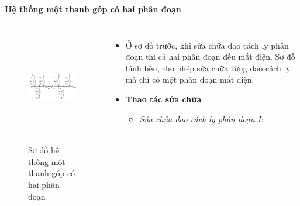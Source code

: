 \documentclass{beamer}
\begin{document}
\begin{frame}{\textbf{Hệ thống một thanh góp có hai phân đoạn }}
\begin{columns}
\begin{figure}[h]
\includegraphics[width=4cm, height=5cm]{mtgc2pd}
\caption{Sơ đồ hệ thống một thanh góp có hai phân đoạn}
\end{figure}

\begin{itemize}
\item Ở sơ đồ trước, khi sửa chữa dao cách ly phân đoạn thì cả hai phân đoạn đều mất điện. Sơ đồ hình bên, cho phép sửa chữa từng dao cách ly mà chỉ có một phân đoạn mất điện.
\item  \textbf{Thao tác sửa chữa}
\begin{itemize}
\item<1-> \emph{Sửa chửa dao cách ly phân đoạn $I$}: 
\end{itemize}
\end{itemize}
\end{columns}
\end{frame}
\end{document}
